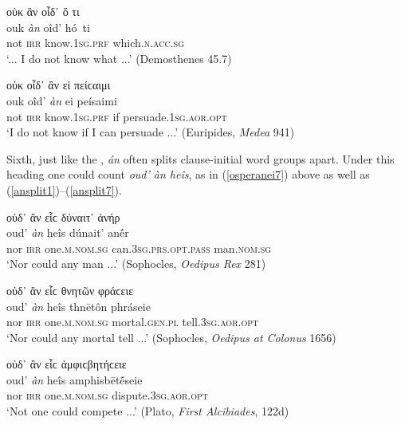 \begin{exe}
\ex οὐκ ἂν οἶδ᾽ ὅ τι\\
\gll ouk \emph{àn} oîd' hó~ti\\
not \textsc{irr} know.\textsc{1sg.prf} which.\textsc{n.acc.sg}\\
\trans `... I do not know what ...' (Demosthenes 45.7)
\label{anraise10}
\end{exe}

\begin{exe}
\ex οὐκ οἶδ᾽ ἂν εἰ πείϲαιμι\\
\gll ouk oîd' \emph{àn} ei peísaimi\\
not \textsc{irr} know.\textsc{1sg.prf} if persuade.\textsc{1sg.aor.opt}\\
\trans `I do not know if I can persuade ...' (Euripides, \textit{Medea} 941)
\label{anraise11}
\end{exe}

Sixth, just like the , \emph{án} often splits clause-initial word groups apart. Under this heading one could count \textit{oud' àn heîs}, as in (\ref{osperanei7}) above as well as (\ref{ansplit1})--(\ref{ansplit7}).

\begin{exe}
\ex οὐδ᾽ ἂν εἷϲ δύναιτ᾽ ἀνήρ\\
\gll oud' \emph{àn} heîs dúnait' anḗr\\
nor \textsc{irr} one.\textsc{m.nom.sg} can.\textsc{3sg.prs.opt.pass} man.\textsc{nom.sg}\\
\trans `Nor could any man ...' (Sophocles, \textit{Oedipus Rex} 281)
\label{ansplit1}
\end{exe}

\begin{exe}
\ex οὐδ᾽ ἂν εἷϲ θνητῶν φράϲειε\\
\gll oud' \emph{àn} heîs thnētôn phráseie\\
nor \textsc{irr} one.\textsc{m.nom.sg} mortal.\textsc{gen.pl} tell.\textsc{3sg.aor.opt}\\
\trans `Nor could any mortal tell ...' (Sophocles, \textit{Oedipus at Colonus} 1656)
\label{ansplit2}
\end{exe}

\begin{exe}
\ex οὐδ᾽ ἂν εἷϲ ἀμφιϲβητήϲειε\\
\gll oud' \emph{àn} heîs amphisbētḗseie\\
nor \textsc{irr} one.\textsc{m.nom.sg} dispute.\textsc{3sg.aor.opt}\\
\trans `Not one could compete ...' (Plato, \textit{First Alcibiades}, 122d)
\label{ansplit3}
\end{exe}

